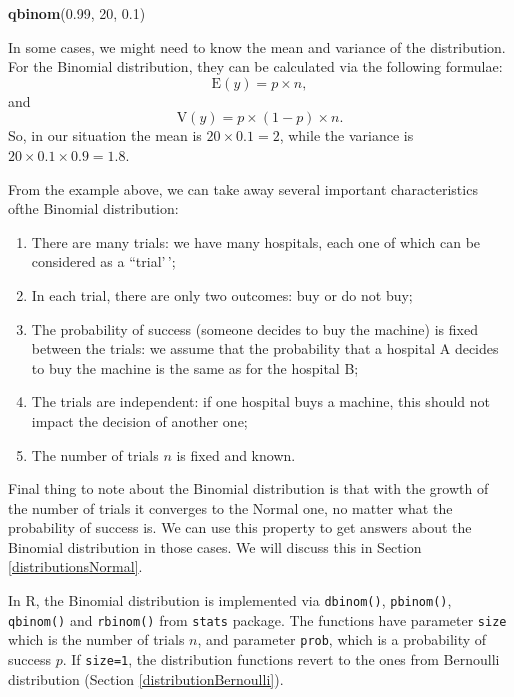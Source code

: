 \documentclass[
]{book}
\newenvironment{Shaded}{\begin{snugshade}}{\end{snugshade}}
\newcommand{\DecValTok}[1]{\textcolor[rgb]{0.00,0.00,0.81}{#1}}
\newcommand{\FloatTok}[1]{\textcolor[rgb]{0.00,0.00,0.81}{#1}}
\newcommand{\FunctionTok}[1]{\textcolor[rgb]{0.13,0.29,0.53}{\textbf{#1}}}
\newcommand{\NormalTok}[1]{#1}
\providecommand{\tightlist}{%
  \setlength{\itemsep}{0pt}\setlength{\parskip}{0pt}}
\theoremstyle{definition}
\theoremstyle{definition}
\theoremstyle{definition}
\theoremstyle{definition}
\theoremstyle{remark}
\begin{document}
\begin{Shaded}
\begin{Highlighting}[]
\FunctionTok{qbinom}\NormalTok{(}\FloatTok{0.99}\NormalTok{, }\DecValTok{20}\NormalTok{, }\FloatTok{0.1}\NormalTok{)}
\end{Highlighting}
\end{Shaded}

In some cases, we might need to know the mean and variance of the distribution. For the Binomial distribution, they can be calculated via the following formulae:
\begin{equation}
    \mathrm{E}(y) = p \times n ,
    \label{eq:BinomialMean}
\end{equation}
and
\begin{equation}
    \mathrm{V}(y) = p \times (1-p) \times n .
    \label{eq:BinomialVariance}
\end{equation}
So, in our situation the mean is \(20 \times 0.1 = 2\), while the variance is \(20 \times 0.1 \times 0.9 = 1.8\).

From the example above, we can take away several important characteristics ofthe Binomial distribution:

\begin{enumerate}
\def\labelenumi{\arabic{enumi}.}
\tightlist
\item
  There are many trials: we have many hospitals, each one of which can be considered as a ``trial'\,';
\item
  In each trial, there are only two outcomes: buy or do not buy;
\item
  The probability of success (someone decides to buy the machine) is fixed between the trials: we assume that the probability that a hospital A decides to buy the machine is the same as for the hospital B;
\item
  The trials are independent: if one hospital buys a machine, this should not impact the decision of another one;
\item
  The number of trials \(n\) is fixed and known.
\end{enumerate}

Final thing to note about the Binomial distribution is that with the growth of the number of trials it converges to the Normal one, no matter what the probability of success is. We can use this property to get answers about the Binomial distribution in those cases. We will discuss this in Section \ref{distributionsNormal}.

In R, the Binomial distribution is implemented via \texttt{dbinom()}, \texttt{pbinom()}, \texttt{qbinom()} and \texttt{rbinom()} from \texttt{stats} package. The functions have parameter \texttt{size} which is the number of trials \(n\), and parameter \texttt{prob}, which is a probability of success \(p\). If \texttt{size=1}, the distribution functions revert to the ones from Bernoulli distribution (Section \ref{distributionBernoulli}).
\end{document}
